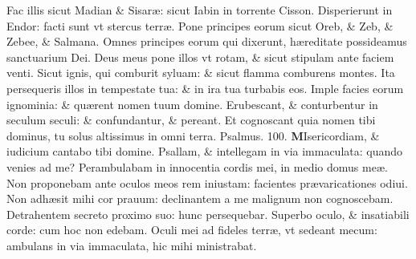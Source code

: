 \documentclass[a5paper,10pt]{book}
\def\ae{æ}
\begin{document}
\begin{multicols*}{2}
\newline \color{red} F\color{black}ac illis sicut Madian \& Sisar\ae : sicut Iabin in torrente Cisson.
\newline \color{red} D\color{black}isperierunt in Endor: facti sunt vt stercus terr\ae .
\newline \color{red} P\color{black}one principes eorum sicut Oreb, \& Zeb, \& Zebee, \& Salmana.
\newline \color{red} O\color{black}mnes principes eorum qui dixerunt, h\ae reditate possideamus sanctuarium Dei.
\newline \color{red} D\color{black}eus meus pone illos vt rotam, \& sicut stipulam ante faciem venti.
\newline \color{red} S\color{black}icut ignis, qui comburit syluam: \& sicut flamma comburens montes.
\newline \color{red} I\color{black}ta persequeris illos in tempestate tua: \& in ira tua turbabis eos.
\newline \color{red} I\color{black}mple facies eorum ignominia: \& qu\ae rent nomen tuum domine.
\newline \color{red} E\color{black}rubescant, \& conturbentur in seculum seculi: \& confundantur, \& pereant.
\newline \color{red} E\color{black}t cognoscant quia nomen tibi dominus, tu solus altissimus in omni terra.
\newline \color{red} Psalmus. \hypertarget{ps100}{100.} \color{black}
\lettrine[lines=2]{\bfseries \color{red} M}{}Isericordiam, \& iudicium cantabo tibi domine.
\newline \color{red} P\color{black}sallam, \& intellegam in via immaculata: quando venies ad me?
\newline \color{red} P\color{black}erambulabam in innocentia cordis mei, in medio domus me\ae .
\newline \color{red} N\color{black}on proponebam ante oculos meos rem iniustam: facientes pr\ae varicationes odiui.
\newline \color{red} N\color{black}on adh\ae sit mihi cor prauum: declinantem a me malignum non cognoscebam.
\newline \color{red} D\color{black}etrahentem secreto proximo suo: hunc persequebar.
\newline \color{red} S\color{black}uperbo oculo, \& insatiabili corde: cum hoc non edebam.
\newline \color{red} O\color{black}culi mei ad fideles terr\ae , vt sedeant mecum: ambulans in via immaculata, hic mihi ministrabat.

\end{multicols*}
\end{document}
